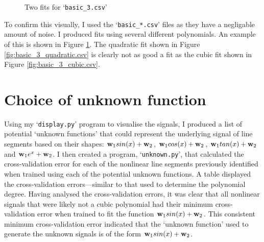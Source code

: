 \documentclass[onecolumn, 12pt, a4paper]{article}
\begin{document}
\begin{figure}[htbp]
    \centering
    \hfill
    \caption{Two fits for `\texttt{basic\_3.csv}'}
    \label{fig:basic_3.csv}
\end{figure}

To confirm this visually, I used the `\texttt{basic\_*.csv}' files
as they have a negligable amount of noise.
I produced fits using several different polynomials.
An example of this is shown in Figure \ref{fig:basic_3.csv}.
The quadratic fit shown in Figure \ref{fig:basic_3_quadratic.csv}
is clearly not as good a fit as the cubic fit shown in Figure \ref{fig:basic_3_cubic.csv}.

\section{Choice of unknown function}

Using my `\texttt{display.py}' program to visualise the
signals, I produced a list of potential `unknown functions'
that could represent the underlying signal of line segments
based on their shapes:
$\vb{w}_{1}sin(x) + \vb{w}_{2}$,
$\vb{w}_{1}cos(x) + \vb{w}_{2}$,
$\vb{w}_{1}tan(x) + \vb{w}_{2}$ and
$\vb{w}_{1}e^{x} + \vb{w}_{2}$.
I then created a program, `\texttt{unknown.py}', that
calculated the cross-validation error for each of the
nonlinear line segments previously identified when
trained using each of the potential unknown functions.
A table displayed the cross-validation errors---similar 
to that used to determine the polynomial degree.
Having analysed the cross-validation errors, it was clear
that all nonlinear signals that were likely not
a cubic polynomial had their minimum cross-validation
error when trained to fit the function
$\vb{w}_{1}sin(x) + \vb{w}_{2}$.
This consistent minimum cross-validation error indicated
that the `unknown function' used to generate the unknown
signals is of the form $\vb{w}_{1}sin(x) + \vb{w}_{2}$.
\end{document}
